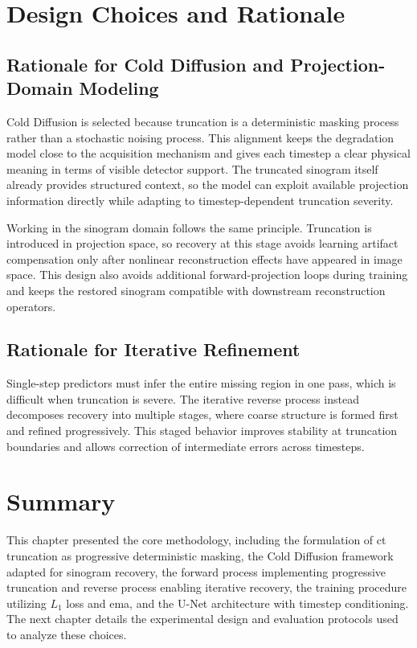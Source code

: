 \section{Design Choices and Rationale}

\subsection{Rationale for Cold Diffusion and Projection-Domain Modeling}

Cold Diffusion is selected because truncation is a deterministic masking process rather than a stochastic noising process. This alignment keeps the degradation model close to the acquisition mechanism and gives each timestep a clear physical meaning in terms of visible detector support. The truncated sinogram itself already provides structured context, so the model can exploit available projection information directly while adapting to timestep-dependent truncation severity.

Working in the sinogram domain follows the same principle. Truncation is introduced in projection space, so recovery at this stage avoids learning artifact compensation only after nonlinear reconstruction effects have appeared in image space. This design also avoids additional forward-projection loops during training and keeps the restored sinogram compatible with downstream reconstruction operators.

\subsection{Rationale for Iterative Refinement}

Single-step predictors must infer the entire missing region in one pass, which is difficult when truncation is severe. The iterative reverse process instead decomposes recovery into multiple stages, where coarse structure is formed first and refined progressively. This staged behavior improves stability at truncation boundaries and allows correction of intermediate errors across timesteps.

\section{Summary}

This chapter presented the core methodology, including the formulation of \gls{ct} truncation as progressive deterministic masking, the Cold Diffusion framework adapted for sinogram recovery, the forward process implementing progressive truncation and reverse process enabling iterative recovery, the training procedure utilizing $L_1$ loss and \gls{ema}, and the U-Net architecture with timestep conditioning. The next chapter details the experimental design and evaluation protocols used to analyze these choices.
